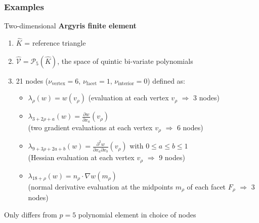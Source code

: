 \documentclass{beamer}
\begin{document}

\begin{frame}
\frametitle{Examples}

Two-dimensional \textbf{Argyris finite element}
\begin{enumerate}
\item $\widehat{K}$ = reference triangle
\item $\widehat{\mathcal{V}} = \mathcal{P}_5(\widehat{K})$, the space of quintic bi-variate polynomials
\item 21 nodes ($\nu_{\text{vertex}}=6$, $\nu_{\text{facet}}=1$, $\nu_{\text{interior}}=0$) defined as:
\begin{itemize}
  \item $\lambda_\rho(w) = w(v_\rho)$ {\footnotesize(evaluation at each vertex $v_\rho$ $\Rightarrow$ 3 nodes)}
  \item $\lambda_{3+2\rho+a}(w) = \frac{\partial w}{\partial x_a}(v_\rho)$\\{\footnotesize(two gradient evaluations at each vertex $v_\rho$ $\Rightarrow$ 6 nodes)}
  \item $\lambda_{9+3\rho+2a+b}(w) = \frac{\partial^2 w}{\partial x_a \partial x_b}(v_\rho)$ with $0\le a\le b\le 1$\\{\footnotesize(Hessian evaluation at each vertex $v_\rho$ $\Rightarrow$ 9 nodes)}
  \item $\lambda_{18+\rho}(w) = n_\rho\cdot \nabla w(m_\rho)$\\{\footnotesize(normal derivative evaluation at the midpoints $m_\rho$ of each facet $F_\rho$ $\Rightarrow$ 3 nodes)}
\end{itemize}
\end{enumerate}
Only differs from $p=5$ polynomial element in choice of nodes
\end{frame}

\end{document}
